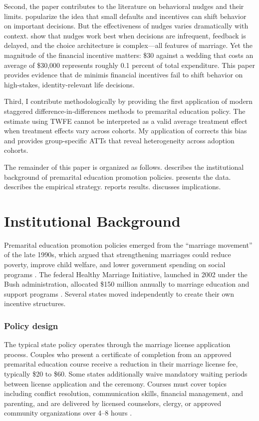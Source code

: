 \documentclass[12pt]{article}
\begin{document}
Second, the paper contributes to the literature on behavioral nudges and their limits. \citet{thaler2008nudge} popularize the idea that small defaults and incentives can shift behavior on important decisions. But the effectiveness of nudges varies dramatically with context. \citet{beshears2013effectiveness} show that nudges work best when decisions are infrequent, feedback is delayed, and the choice architecture is complex---all features of marriage. Yet the magnitude of the financial incentive matters: \$30 against a wedding that costs an average of \$30,000 \citep{theknot2023} represents roughly 0.1 percent of total expenditure. This paper provides evidence that de minimis financial incentives fail to shift behavior on high-stakes, identity-relevant life decisions.

Third, I contribute methodologically by providing the first application of modern staggered difference-in-differences methods to premarital education policy. The \citet{clyde2019premarital} estimate using TWFE cannot be interpreted as a valid average treatment effect when treatment effects vary across cohorts. My application of \citet{callaway2021difference} corrects this bias and provides group-specific ATTs that reveal heterogeneity across adoption cohorts.

The remainder of this paper is organized as follows.  describes the institutional background of premarital education promotion policies.  presents the data.  describes the empirical strategy.  reports results.  discusses implications.


\section{Institutional Background}
\label{sec:background}

Premarital education promotion policies emerged from the ``marriage movement'' of the late 1990s, which argued that strengthening marriages could reduce poverty, improve child welfare, and lower government spending on social programs \citep{waite2000case}. The federal Healthy Marriage Initiative, launched in 2002 under the Bush administration, allocated \$150 million annually to marriage education and support programs \citep{hawkins2012does}. Several states moved independently to create their own incentive structures.

\subsubsection*{Policy design} The typical state policy operates through the marriage license application process. Couples who present a certificate of completion from an approved premarital education course receive a reduction in their marriage license fee, typically \$20 to \$60. Some states additionally waive mandatory waiting periods between license application and the ceremony. Courses must cover topics including conflict resolution, communication skills, financial management, and parenting, and are delivered by licensed counselors, clergy, or approved community organizations over 4--8 hours \citep{fawcett2010getting}.
\end{document}
